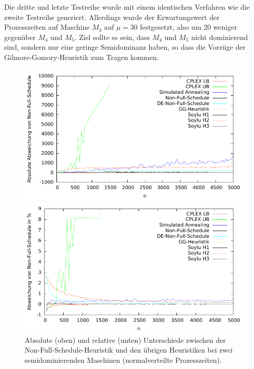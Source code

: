 \documentclass{scrreprt}
\begin{document}
Die dritte und letzte Testreihe wurde mit einem identischen Verfahren wie die zweite Testreihe generiert.
Allerdings wurde der Erwartungswert der Prozesszeiten auf Maschine $M_3$ auf $\mu=30$ festgesetzt, also um $20$ weniger gegenüber $M_4$ und $M_5$.
Ziel sollte es sein, dass $M_4$ und $M_5$ nicht dominierend sind, sondern nur eine geringe Semidominanz haben, 
so dass die Vorzüge der Gilmore-Gomory-Heuristik zum Tragen kommen.
\begin{figure}
    \begin{center}
        \includegraphics[width=.8\textwidth]{../instances/2quasidom/plot.pdf}
    \end{center}
    \begin{center}
        \includegraphics[width=.8\textwidth]{../instances/2quasidom/plotrel.pdf}
    \end{center}
    \caption{
        \label{abb:2quasidom}
        Absolute (oben) und relative (unten) Unterschiede zwischen der Non-Full-Schedule-Heuristik und den übrigen Heuristiken
        bei zwei semidominierenden Maschinen (normalverteilte Prozesszeiten).
    }
\end{figure}
\end{document}
